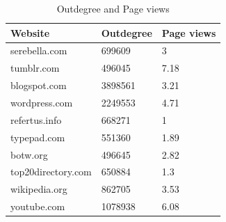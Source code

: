 \begin{table}[t]
	\caption{Outdegree and Page views}
	\label{t4}
	\begin{center}
		\begin{tabular}{|l|l|l|}
			\hline
			Website	&Outdegree	&Page views \\ \hline
			serebella.com	&699609	&3 \\ \hline
			tumblr.com	&496045	&7.18 \\ \hline
			blogspot.com	&3898561	&3.21 \\ \hline
			wordpress.com	&2249553	&4.71 \\ \hline
			refertus.info	&668271	&1 \\ \hline
			typepad.com	&551360	&1.89 \\ \hline
			botw.org	&496645	&2.82 \\ \hline
			top20directory.com	&650884	&1.3 \\ \hline
			wikipedia.org	&862705	&3.53 \\ \hline	
			youtube.com	&1078938	&6.08 \\ \hline			
		\end{tabular}
	\end{center}
\end{table}
